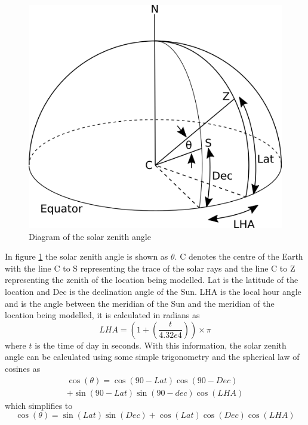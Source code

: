 \documentclass[a4paper]{refart}
\begin{document}
\begin{figure}[ht]
    \centering
    \includegraphics{solarzenith.png}
    \caption{Diagram of the solar zenith angle}
    \label{fig:solarzenith}
\end{figure}
In figure \ref{fig:solarzenith} the solar zenith angle is shown as $\theta$. C denotes the centre of the Earth with the line C to S representing the trace of the solar rays and the line C to Z representing the zenith of the location being modelled. Lat is the latitude of the location and Dec is the declination angle of the Sun. LHA is the local hour angle and is the angle between the meridian of the Sun and the meridian of the location being modelled, it is calculated in radians as
\begin{equation}
    LHA = \left(1+\left(\frac{t}{4.32e4}\right)\right)\times\pi
\end{equation}
where $t$ is the time of day in seconds. With this information, the solar zenith angle can be calculated using some simple trigonometry and the spherical law of cosines as
\begin{multline}
    \cos(\theta) = \cos(90-Lat)\cos(90-Dec)\\
    +\sin(90-Lat)\sin(90-dec)\cos(LHA)
\end{multline}
which simplifies to
\begin{equation}
    \cos(\theta) = \sin(Lat)\sin(Dec)+\cos(Lat)\cos(Dec)\cos(LHA)
\end{equation}
\end{document}
